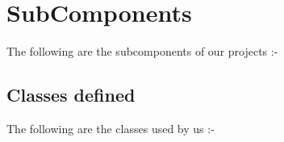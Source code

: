 \section{SubComponents}
The following are the subcomponents of our projects :-
\subsection{Classes defined}
The following are the classes used by us :-

